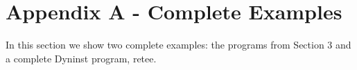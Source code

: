 \section[Appendix A {}- Complete Examples]{Appendix A - Complete Examples}

In this section we show two complete examples: the programs from Section 3 and a complete Dyninst
program, retee.




